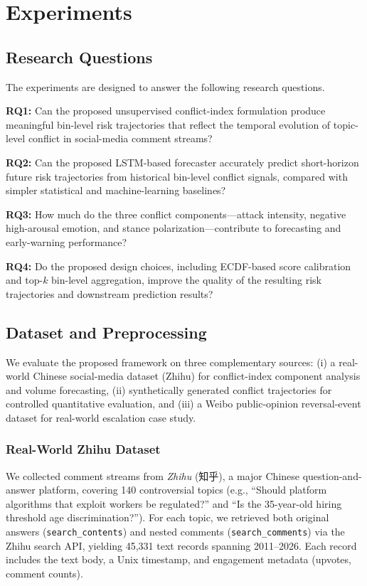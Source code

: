 \documentclass[journal]{IEEEtran}
\begin{document}
\section{Experiments}\label{sec:experiments}

\subsection{Research Questions}

The experiments are designed to answer the following research questions.

\noindent\textbf{RQ1:} Can the proposed unsupervised conflict-index formulation produce meaningful bin-level risk trajectories that reflect the temporal evolution of topic-level conflict in social-media comment streams?

\noindent\textbf{RQ2:} Can the proposed LSTM-based forecaster accurately predict short-horizon future risk trajectories from historical bin-level conflict signals, compared with simpler statistical and machine-learning baselines?

\noindent\textbf{RQ3:} How much do the three conflict components---attack intensity, negative high-arousal emotion, and stance polarization---contribute to forecasting and early-warning performance?

\noindent\textbf{RQ4:} Do the proposed design choices, including ECDF-based score calibration and top-$k$ bin-level aggregation, improve the quality of the resulting risk trajectories and downstream prediction results?

\subsection{Dataset and Preprocessing}
\label{sec:dataset}

We evaluate the proposed framework on three complementary sources: (i) a real-world Chinese social-media dataset (Zhihu) for conflict-index component analysis and volume forecasting, (ii) synthetically generated conflict trajectories for controlled quantitative evaluation, and (iii) a Weibo public-opinion reversal-event dataset for real-world escalation case study.

\subsubsection{Real-World Zhihu Dataset}

We collected comment streams from \emph{Zhihu} (知乎), a major Chinese question-and-answer platform, covering 140 controversial topics (e.g., ``Should platform algorithms that exploit workers be regulated?'' and ``Is the 35-year-old hiring threshold age discrimination?''). For each topic, we retrieved both original answers (\texttt{search\_contents}) and nested comments (\texttt{search\_comments}) via the Zhihu search API, yielding 45,331 text records spanning 2011--2026. Each record includes the text body, a Unix timestamp, and engagement metadata (upvotes, comment counts).
\end{document}
